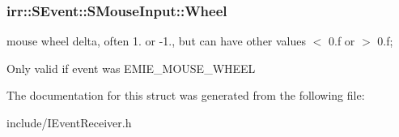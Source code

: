 \subsubsection[{\texorpdfstring{Wheel}{Wheel}}]{ irr\+::\+S\+Event\+::\+S\+Mouse\+Input\+::\+Wheel}\hypertarget{structirr_1_1SEvent_1_1SMouseInput_a0821c616196a7ffcc574e68c060b6d18}{}\label{structirr_1_1SEvent_1_1SMouseInput_a0821c616196a7ffcc574e68c060b6d18}


mouse wheel delta, often 1. or -\/1., but can have other values $<$ 0.\+f or $>$ 0.\+f; 

Only valid if event was E\+M\+I\+E\+\_\+\+M\+O\+U\+S\+E\+\_\+\+W\+H\+E\+EL 

The documentation for this struct was generated from the following file\+:\begin{DoxyCompactItemize}
\item 
include/I\+Event\+Receiver.\+h\end{DoxyCompactItemize}
